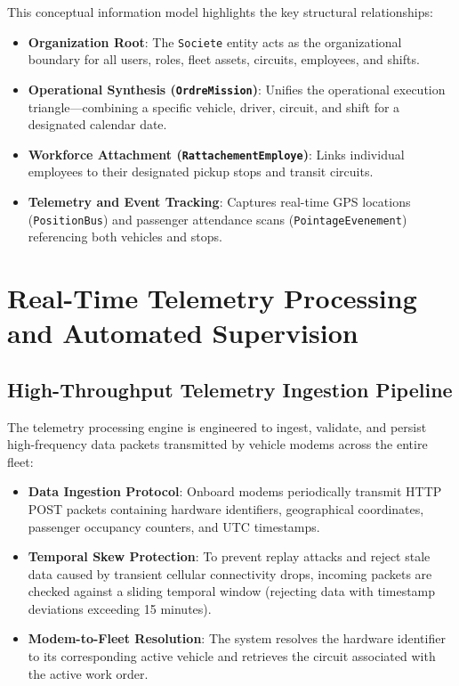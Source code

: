 This conceptual information model highlights the key structural relationships:
\begin{itemize}
  \item \textbf{Organization Root}: The \texttt{Societe} entity acts as the organizational boundary for all users, roles, fleet assets, circuits, employees, and shifts.
  \item \textbf{Operational Synthesis (\texttt{OrdreMission})}: Unifies the operational execution triangle---combining a specific vehicle, driver, circuit, and shift for a designated calendar date.
  \item \textbf{Workforce Attachment (\texttt{RattachementEmploye})}: Links individual employees to their designated pickup stops and transit circuits.
  \item \textbf{Telemetry and Event Tracking}: Captures real-time GPS locations (\texttt{PositionBus}) and passenger attendance scans (\texttt{PointageEvenement}) referencing both vehicles and stops.
\end{itemize}

\section{Real-Time Telemetry Processing and Automated Supervision}
\label{sec:telemetry_supervision}

\subsection{High-Throughput Telemetry Ingestion Pipeline}
The telemetry processing engine is engineered to ingest, validate, and persist high-frequency data packets transmitted by vehicle modems across the entire fleet:
\begin{itemize}
  \item \textbf{Data Ingestion Protocol}: Onboard modems periodically transmit HTTP POST packets containing hardware identifiers, geographical coordinates, passenger occupancy counters, and UTC timestamps.
  \item \textbf{Temporal Skew Protection}: To prevent replay attacks and reject stale data caused by transient cellular connectivity drops, incoming packets are checked against a sliding temporal window (rejecting data with timestamp deviations exceeding 15 minutes).
  \item \textbf{Modem-to-Fleet Resolution}: The system resolves the hardware identifier to its corresponding active vehicle and retrieves the circuit associated with the active work order.
\end{itemize}

